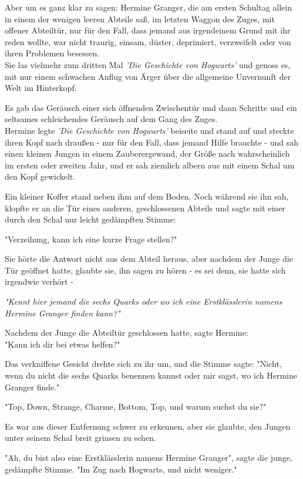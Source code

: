 {Aber um es ganz klar zu sagen: Hermine Granger, die am ersten Schultag allein in einem der wenigen leeren Abteile saß, im letzten Waggon des Zuges, mit offener Abteiltür, nur für den Fall, dass jemand aus irgendeinem Grund mit ihr reden wollte, war nicht traurig, einsam, düster, deprimiert, verzweifelt oder von ihren Problemen besessen.\\ Sie las vielmehr zum dritten Mal \emph{'Die Geschichte von Hogwarts'} und genoss es, mit nur einem schwachen Anflug von Ärger über die allgemeine Unvernunft der Welt im Hinterkopf.

Es gab das Geräusch einer sich öffnenden Zwischentür und dann Schritte und ein seltsames schleichendes Geräusch auf dem Gang des Zuges.\\ Hermine legte \emph{'Die Geschichte von Hogwarts'} beiseite und stand auf und steckte ihren Kopf nach draußen - nur für den Fall, dass jemand Hilfe brauchte - und sah einen kleinen Jungen in einem Zauberergewand, der Größe nach wahrscheinlich im ersten oder zweiten Jahr, und er sah ziemlich albern aus mit einem Schal um den Kopf gewickelt.

Ein kleiner Koffer stand neben ihm auf dem Boden. Noch während sie ihn sah, klopfte er an die Tür eines anderen, geschlossenen Abteils und sagte mit einer durch den Schal nur leicht gedämpften Stimme:

"Verzeihung, kann ich eine kurze Frage stellen?"

Sie hörte die Antwort nicht aus dem Abteil heraus, aber nachdem der Junge die Tür geöffnet hatte, glaubte sie, ihn sagen zu hören - es sei denn, sie hatte sich irgendwie verhört -

\emph{"Kennt hier jemand die sechs Quarks oder wo ich eine Erstklässlerin namens Hermine Granger finden kann?"}

Nachdem der Junge die Abteiltür geschlossen hatte, sagte Hermine:\\ "Kann ich dir bei etwas helfen?"

Das verkniffene Gesicht drehte sich zu ihr um, und die Stimme sagte: "Nicht, wenn du nicht die sechs Quarks benennen kannst oder mir sagst, wo ich Hermine Granger finde."

"Top, Down, Strange, Charme, Bottom, Top, und warum suchst du sie?"

Es war aus dieser Entfernung schwer zu erkennen, aber sie glaubte, den Jungen unter seinem Schal breit grinsen zu sehen.

"Ah, du bist also eine Erstklässlerin namens Hermine Granger", sagte die junge, gedämpfte Stimme. "Im Zug nach Hogwarts, und nicht weniger."

}
